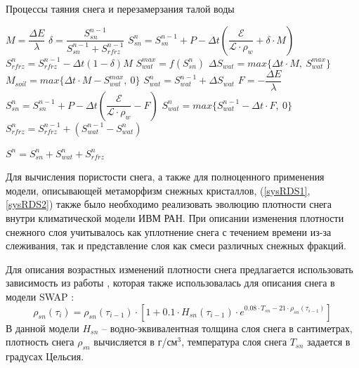 \documentclass[a4paper, fontsize=14pt]{scrartcl}
\begin{document}
\begin{algorithm}[H]
\caption{Процессы таяния снега и перезамерзания талой воды}
\label{alg:setup}
\begin{algorithmic}[]
        \State $ M = \dfrac{\Delta E}{\lambda} $ 
        \State $ \delta = \dfrac{S_{sn}^{n-1}}{S_{sn}^{n-1} + S_{rfrz}^{n - 1}}$ 
        \State $ S_{sn}^n = S_{sn}^{n-1} + P - \Delta t \left( \dfrac{\mathcal{E}}{\mathcal{L} \cdot \rho_w} + \delta \cdot M \right) $ 
        \State $ S_{rfrz}^n = S_{rfrz}^{n - 1} - \Delta t (1 - \delta)M $ 
        \State $ S_{wat}^{max} = f( S_{sn}^n ) $
        \State $ \Delta S_{wat} = max\{\Delta t \cdot M, ~S_{wat}^{max}\} $ 
        \State $ M_{soil} = max\{\Delta t \cdot M - S_{wat}^{max}, ~0\} $ 
        \State $ S_{wat}^n = S_{wat}^{n-1} + \Delta S_{wat} $ 
    \Else
            \State $F = -\dfrac{\Delta E}{\lambda}$
            \State $S_{sn}^n = S_{sn}^{n-1} + P - \Delta t \left( \dfrac{\mathcal{E}}{\mathcal{L} \cdot \rho_w} - F \right)$
            \State $S_{wat}^n = max\{ S_{wat}^{n-1} - \Delta t \cdot F, ~0\}$
            \State $S_{rfrz}^n = S_{rfrz}^{n - 1} + ( S_{wat}^{n-1} - S_{wat}^n )$
            
        \EndIf
    \EndIf
    \State $S^n = S_{sn}^n + S_{wat}^n + S_{rfrz}^n$
\end{algorithmic}
\end{algorithm}


\newpage
Для вычисления пористости снега, а также для полноценного применения модели, описывающей метаморфизм снежных кристаллов, (\eqref{sysRDS1}, \eqref{sysRDS2}) также было необходимо реализовать эволюцию плотности снега внутри климатической модели ИВМ РАН. При описании изменения плотности снежного слоя учитывалось как уплотнение снега с течением времени из-за слеживания, так и представление слоя как смеси различных снежных фракций. 

Для описания возрастных изменений плотности снега предлагается использовать зависимость из работы \cite{YOSIDA1955}, которая также использовалась для описания снега в модели SWAP \cite{Gusev2002} :
\begin{equation}
    \rho_{sn}(\tau_i) = \rho_{sn}(\tau_{i-1}) \cdot \left[  1 + 0.1 \cdot H_{sn}(\tau_{i-1}) \cdot e^{ 0.08 \cdot T_{sn} - 21 \cdot \rho_{sn}(\tau_{i-1})} \right]    \label{sysRHOOLD}  
\end{equation}
В данной модели $H_{sn}$ -- водно-эквивалентная толщина слоя снега в сантиметрах, плотность снега $\rho_{sn}$ вычисляется в г/см$^3$, температура слоя снега $T_{sn}$ задается в градусах Цельсия. 
\end{document}

